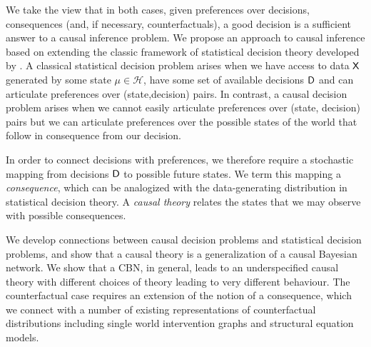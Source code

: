 We take the view that in both cases, given preferences over decisions, consequences (and, if necessary, counterfactuals), a good decision is a sufficient answer to a causal inference problem. We propose an approach to causal inference based on extending the classic framework of statistical decision theory developed by \cite{wald_statistical_1950}. A classical statistical decision problem arises when we have access to data $\mathsf{X}$ generated by some state $\mu\in \mathscr{H}$, have some set of available decisions $\mathsf{D}$ and can articulate preferences over (state,decision) pairs. In contrast, a causal decision problem arises when we cannot easily articulate preferences over (state, decision) pairs but we can articulate preferences over the possible states of the world that follow in consequence from our decision.

In order to connect decisions with preferences, we therefore require a stochastic mapping from decisions $\mathsf{D}$ to possible future states. We term this mapping a \emph{consequence}, which can be analogized with the data-generating distribution in statistical decision theory. A \emph{causal theory} relates the states that we may observe with possible consequences.

We develop connections between causal decision problems and statistical decision problems, and show that a causal theory is a generalization of a causal Bayesian network. We show that a CBN, in general, leads to an underspecified causal theory with different choices of theory leading to very different behaviour. The counterfactual case requires an extension of the notion of a consequence, which we connect with a number of existing representations of counterfactual distributions including single world intervention graphs and structural equation models.